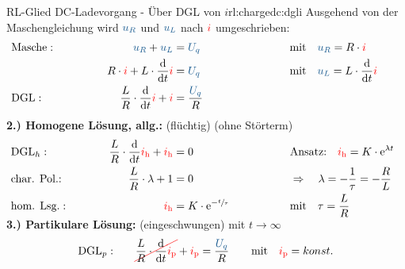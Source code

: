 \begin{frame}[t]
{\begin{bsp}{RL-Glied DC-Ladevorgang - Über DGL von $i$}{rl:chargedc:dgli}
    Ausgehend von der Maschengleichung wird $\ecv{u_R}$ und $\ecv{u_L}$ nach ${\color{red}i}$ umgeschrieben:%
    \begingroup%
        \addtolength{\jot}{2pt}%
    \begin{align*}
        &\text{Masche}:&&&
            \ecv{u_R} + \ecv{u_L}  &= \ecv{U_q}&&&
            &\text{mit}\quad \ecv{u_R} = R \cdot \eci{i} \\
        &&&&
            R \cdot \eci{i} + L \cdot \frac{\mathrm{d}}{\mathrm{d}t} \eci{i} &= \ecv{U_q} &&&
            &\text{mit}\quad \ecv{u_L} = L \cdot \frac{\mathrm{d}}{\mathrm{d}t} \eci{i} \\
        &\text{DGL}:&&&
        \frac{L}{R} \cdot \frac{\mathrm{d}}{\mathrm{d}t} \eci{i}  + \eci{i}  &= \frac{\ecv{U_q}}{R}
        \\[-15pt]&\hphantom{R1oooooooooo}&&&\hphantom{L3ooooooooooo}&\hphantom{R3ooooooooooooooo}&&&&\hphantom{R5oooooooooooooooooo}\nonumber%
    \end{align*}%
    \textbf{2.) Homogene Lösung, allg.:} (flüchtig) (ohne Störterm)%
    \begin{align*}%
        &\text{DGL}_{h}:&&&
            \frac{L}{R} \cdot \frac{\mathrm{d}}{\mathrm{d}t} \eci{i_{\mathrm h}} + \eci{i_{\mathrm h}} &= 0 &&&
                &\text{Ansatz:}\quad
                \eci{i_{\mathrm h}} = K \cdot \mathrm{e}^{\lambda t}\\
        &\text{char. Pol.:}&&&
            \frac{L}{R} \cdot \lambda + 1 &= 0 &&&
                &\Rightarrow\quad \lambda = -\frac{1}{\tau} = -\frac{R}{L}\\
        &\text{hom. Lsg.}:&&&
            \eci{i_{\mathrm h}} &= K \cdot \mathrm{e}^{-\sfrac{t}{\tau}}&&&
                &\text{mit}\quad \tau = \frac{L}{R}
        \\[-15pt]&\hphantom{R1oooooooooo}&&&\hphantom{L3ooooooooooo}&\hphantom{R3ooooooooooooooo}&&&&\hphantom{R5oooooooooooooooooo}\nonumber%
    \end{align*}%
    \textbf{3.) Partikulare Lösung:} (eingeschwungen) mit $t \to \infty$%
    \begin{align*}%
        &\text{DGL}_{p}:&&&
            \redcancel{\frac{L}{R} \cdot \frac{\mathrm{d}}{\mathrm{d}t} \eci{i_{\mathrm p}}} + \eci{i_{\mathrm p}} &= \frac{\ecv{U_q}}{R} &&&
                &\text{mit}\quad \eci{i_{\mathrm p}} = konst.  \\

\end{align*}
\end{bsp}}
\end{frame}
